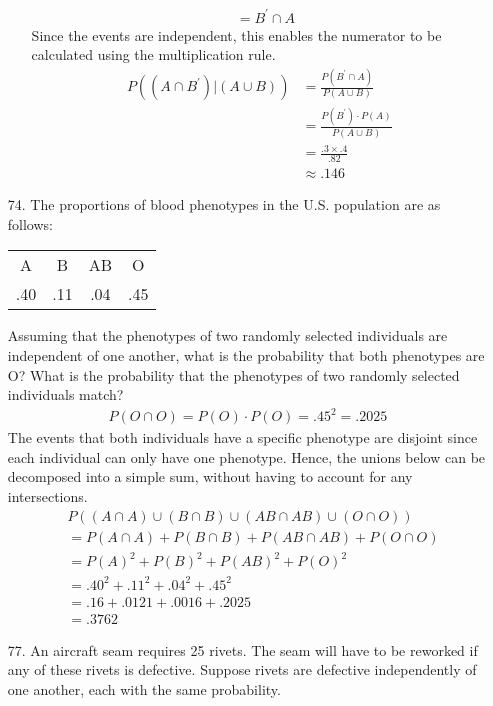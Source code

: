 \documentclass[letterpaper,12pt]{article}
\begin{document}
\begin{enumerate}
\begin{enumerate}
\begin{align*}
          &= B^\prime \cap A
        \end{align*}
        Since the events are independent, this enables the numerator to be calculated using the multiplication rule.
        \begin{align*}
          P((A \cap B^\prime)|(A \cup B)) &= \frac{P(B^\prime \cap A)}{P(A \cup B)} \\
          &= \frac{P(B^\prime) \cdot P(A)}{P(A \cup B)} \\
          &= \frac{.3 \times .4}{.82} \\
          &\approx .146
        \end{align*}
    \end{enumerate}
  \item[74.]
    The proportions of blood phenotypes in the U.S. population are as follows:
    \begin{center}
      \begin{tabular}{cccc}
        A & B & AB & O \\
        .40 & .11 & .04 & .45
      \end{tabular}
    \end{center}
    Assuming that the phenotypes of two randomly selected individuals are independent of one another, what is the probability that both phenotypes are O? What is the probability that the phenotypes of two randomly selected individuals match?
    \begin{align*}
      P(O \cap O) = P(O) \cdot P(O) = {.45}^2 = .2025
    \end{align*}
    The events that both individuals have a specific phenotype are disjoint since each individual can only have one phenotype. Hence, the unions below can be decomposed into a simple sum, without having to account for any intersections.
    \begin{align*}
      &P((A \cap A) \cup (B \cap B) \cup (AB \cap AB) \cup (O \cap O)) \\
      &= P(A \cap A) + P(B \cap B) + P(AB \cap AB) + P(O \cap O) \\
      &= P(A)^2 + P(B)^2 + P(AB)^2 + P(O)^2 \\
      &= {.40}^2 + {.11}^2 + {.04}^2 + {.45}^2 \\
      &= .16 + .0121 + .0016 + .2025 \\
      &= .3762
    \end{align*}
  \item[77.]
    An aircraft seam requires 25 rivets. The seam will have to be reworked if any of these rivets is defective. Suppose rivets are defective independently of one another, each with the same probability.

\end{enumerate}
\end{document}

